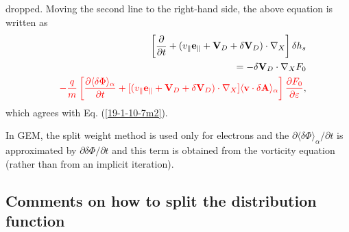 \documentclass{llncs}
\newcommand{\tmcolor}[2]{{\color{#1}{#2}}}
\begin{document}
dropped. Moving the second line to the right-hand side, the above equation is
written as
\begin{eqnarray}
  &  & \left[ \frac{\partial}{\partial t} + (v_{\parallel}
  \mathbf{e}_{\parallel} +\mathbf{V}_D + \delta \mathbf{V}_D) \cdot \nabla_X
  \right] \delta h_s \nonumber\\
  &  & = - \delta \mathbf{V}_D \cdot \nabla_X F_0 \nonumber\\
  &  & \tmcolor{red}{- \frac{q}{m}  \left[ \frac{\partial \langle \delta \Phi
  \rangle_{\alpha}}{\partial t} + [(v_{\parallel} \mathbf{e}_{\parallel}
  +\mathbf{V}_D + \delta \mathbf{V}_D) \cdot \nabla_X] \langle \mathbf{v}
  \cdot \delta \mathbf{A} \rangle_{\alpha} \right] \frac{\partial
  F_0}{\partial \varepsilon}},  \label{19-1-10-e2}
\end{eqnarray}
which agrees with Eq. (\ref{19-1-10-7m2}).

In GEM, the split weight method is used only for electrons and the $\partial
\langle \delta \Phi \rangle_{\alpha} / \partial t$ is approximated by
$\partial \delta \Phi / \partial t$ and this term is obtained from the
vorticity equation (rather than from an implicit iteration).

\subsection{Comments on how to split the distribution function}
\end{document}
